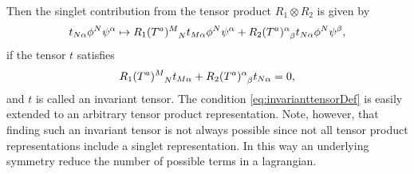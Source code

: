 Then the singlet contribution from the tensor product $R_1\otimes R_2$ is given by 
\begin{equation}
    t_{N\alpha}\phi^N\psi^\alpha \mapsto \tensor{R_1(T^a)}{^M_N}t_{M\alpha}\phi^N\psi^\alpha+\tensor{R_2(T^a)}{^\alpha_\beta}t_{N\alpha}\phi^N\psi^\beta ,
\end{equation}
if the tensor $t$ satisfies
\begin{equation}\label{eq:invarianttensorDef}
    \tensor{R_1(T^a)}{^M_N}t_{M\alpha}+\tensor{R_2(T^a)}{^\alpha_\beta}t_{N\alpha} = 0,
\end{equation}
and $t$ is called an invariant tensor. The condition \eqref{eq:invarianttensorDef} is easily extended to an arbitrary tensor product representation. Note, however, that finding such an invariant tensor is not always possible since not all tensor product representations include a singlet representation. In this way an underlying symmetry reduce the number of possible terms in a lagrangian. 

